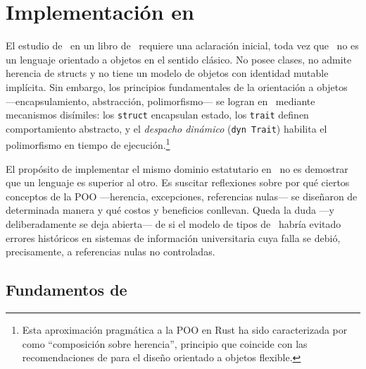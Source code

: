 
\chapter{Implementación en \rust}
\label{cap:rust}


\noindent
El estudio de \rust\ en un libro de \poo\ requiere una aclaración inicial, toda
vez que \rust\ no es un lenguaje orientado a objetos en el sentido clásico. No
posee clases, no admite herencia de structs y no tiene un modelo de objetos con
identidad mutable implícita. Sin embargo, los principios fundamentales de la
orientación a objetos ---encapsulamiento, abstracción, polimorfismo--- se logran
en \rust\ mediante mecanismos disímiles: los \texttt{struct} encapsulan estado,
los \texttt{trait} definen comportamiento abstracto, y el \textit{despacho dinámico}
(\texttt{dyn Trait}) habilita el polimorfismo en tiempo de ejecución.\footnote{Esta
aproximación pragmática a la POO en Rust ha sido caracterizada por \textcite{Klabnik2023}
como ``composición sobre herencia'', principio que coincide con las recomendaciones
de \textcite{Gamma1994} para el diseño orientado a objetos flexible.}

El propósito de implementar el mismo dominio estatutario en \rust\ no es demostrar
que un lenguaje es superior al otro. Es suscitar reflexiones sobre por qué ciertos
conceptos de la POO ---herencia, excepciones, referencias nulas--- se diseñaron de
determinada manera y qué costos y beneficios conllevan. Queda la duda ---y
deliberadamente se deja abierta--- de si el modelo de tipos de \rust\ habría evitado
errores históricos en sistemas de información universitaria cuya falla se debió,
precisamente, a referencias nulas no controladas.

\section{Fundamentos de \rust}
\label{sec:rust-fundamentos}

